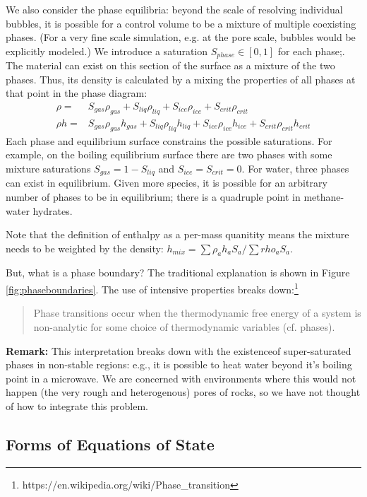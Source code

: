\documentclass[AMA,STIX1COL]{WileyNJD-v2}
\begin{document}
We also consider the phase equilibria: beyond the scale of resolving
individual bubbles, it is possible
for a control volume to be a mixture of multiple coexisting
phases.
(For a very fine scale simulation, e.g. at the pore scale, bubbles
would be explicitly modeled.)
We introduce a saturation $S_{phase}\in[0,1]$ for each phase;.
The material can exist on this section of the surface as a mixture of
the two phases. Thus, its density is calculated by a mixing the
properties of all phases at that point in the phase diagram:
\begin{align}
  \rho = & S_{gas} \rho_{gas} + S_{liq} \rho_{liq} + S_{ice}
  \rho_{ice} + S_{crit} \rho_{crit} \\
  \rho h =& S_{gas} \rho_{gas} h_{gas} + S_{liq} \rho_{liq} h_{liq} + S_{ice}
  \rho_{ice} h_{ice} + S_{crit} \rho_{crit} h_{crit}
\end{align}
Each phase
and equilibrium surface constrains the possible saturations. For example, on the boiling equilibrium surface there are two phases with some mixture
saturations \(S_{gas}=1-S_{liq}\) and $S_{ice}=S_{crit}=0$. 
For water, three phases can exist in equilibrium. Given more species, it is possible for an arbitrary number of phases
to be in equilibrium; there is a quadruple point in methane-water
hydrates.

Note that the definition of enthalpy as a per-mass quanitity means the mixture needs to be weighted by the
density: $h_{mix}=\sum{\rho_a h_aS_a}/\sum{rho_aS_a}$.

But, what is a phase boundary? The traditional explanation is shown in
Figure \ref{fig:phaseboundaries}. The use of intensive properties breaks down:\footnote{https://en.wikipedia.org/wiki/Phase\_transition}

\begin{quote}
Phase transitions occur when the thermodynamic free energy of a system
is non-analytic for some choice of thermodynamic variables (cf. phases).
\end{quote}


{\bf Remark:} This interpretation breaks down with the existenceof super-saturated phases in non-stable regions: e.g., it is possible to
heat water beyond it's boiling point in a microwave. We are concerned
with environments where this would not happen (the very rough and
heterogenous) pores of rocks, so we have not thought of how to
integrate this problem.

\subsection{Forms of Equations of State}
\end{document}

